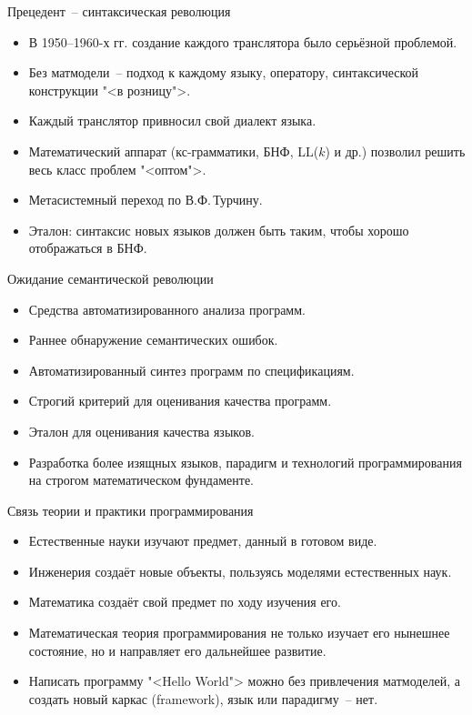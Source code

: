 \documentclass[landscape]{slides}
\begin{document}
\begin{slide}
Прецедент~-- синтаксическая революция
\begin{itemize}
\item В 1950--1960-х гг. создание каждого транслятора было серьёзной проблемой.
\item Без матмодели~-- подход к каждому языку, оператору, синтаксической конструкции "<в розницу">.
\item Каждый транслятор привносил свой диалект языка.
\item Математический аппарат (кс-грамматики, БНФ, LL($k$) и др.) позволил решить весь класс проблем "<оптом">.
\item Метасистемный переход по В.Ф.\,Турчину.
\item Эталон: синтаксис новых языков должен быть таким, чтобы хорошо отображаться в БНФ.
\end{itemize}
\end{slide}

\begin{slide}
Ожидание семантической революции
\begin{itemize}
\item Средства автоматизированного анализа программ.
\item Раннее обнаружение семантических ошибок.
\item Автоматизированный синтез программ по спецификациям.
\item Строгий критерий для оценивания качества программ.
\item Эталон для оценивания качества языков.
\item Разработка более изящных языков, парадигм и технологий программирования на строгом математическом фундаменте.
\end{itemize}
\end{slide}

\begin{slide}
Связь теории и практики программирования
\begin{itemize}
\item Естественные науки изучают предмет, данный в готовом виде.
\item Инженерия создаёт новые объекты, пользуясь моделями естественных наук.
\item Математика создаёт свой предмет по ходу изучения его.
\item Математическая теория программирования не только изучает его нынешнее состояние, но и направляет его дальнейшее развитие.
\item Написать программу "<Hello World"> можно без привлечения матмоделей, а создать новый каркас (framework), язык или парадигму~-- нет.
\end{itemize}
\end{slide}
\end{document}
